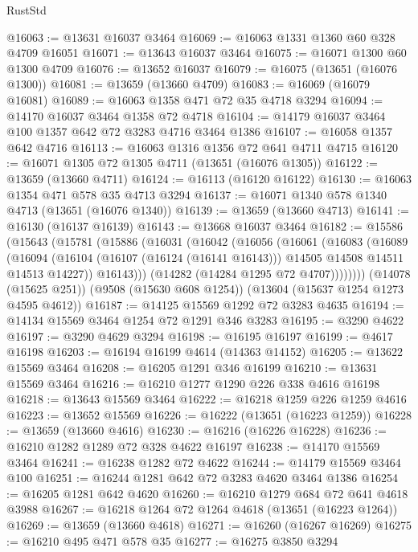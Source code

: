 \begin{lexlean}{RustStd}
\begin{coremodule}
@16063 := @13631 @16037 @3464
@16069 := @16063 @1331 @1360 @60 @328 @4709 @16051
@16071 := @13643 @16037 @3464
@16075 := @16071 @1300 @60 @1300 @4709
@16076 := @13652 @16037
@16079 := @16075 (@13651 (@16076 @1300))
@16081 := @13659 (@13660 @4709)
@16083 := @16069 (@16079 @16081)
@16089 := @16063 @1358 @471 @72 @35 @4718 @3294
@16094 := @14170 @16037 @3464 @1358 @72 @4718
@16104 := @14179 @16037 @3464 @100 @1357 @642 @72 @3283 @4716 @3464 @1386
@16107 := @16058 @1357 @642 @4716
@16113 := @16063 @1316 @1356 @72 @641 @4711 @4715
@16120 := @16071 @1305 @72 @1305 @4711 (@13651 (@16076 @1305))
@16122 := @13659 (@13660 @4711)
@16124 := @16113 (@16120 @16122)
@16130 := @16063 @1354 @471 @578 @35 @4713 @3294
@16137 := @16071 @1340 @578 @1340 @4713 (@13651 (@16076 @1340))
@16139 := @13659 (@13660 @4713)
@16141 := @16130 (@16137 @16139)
@16143 := @13668 @16037 @3464
@16182 := @15586
    (@15643
      (@15781
        (@15886
          (@16031
            (@16042
              (@16056
                (@16061
                  (@16083
                    (@16089
                      (@16094
                        (@16104
                          (@16107 (@16124 (@16141 @16143)))
                          @14505
                          @14508
                          @14511
                          @14513
                          @14227))
                      @16143)))
                (@14282 (@14284 @1295 @72 @4707))))))))
    (@14078 (@15625 @251))
    (@9508 (@15630 @608 @1254))
    (@13604 (@15637 @1254 @1273 @4595 @4612))
@16187 := @14125 @15569 @1292 @72 @3283 @4635
@16194 := @14134 @15569 @3464 @1254 @72 @1291 @346 @3283
@16195 := @3290 @4622
@16197 := @3290 @4629 @3294
@16198 := @16195 @16197
@16199 := @4617 @16198
@16203 := @16194 @16199 @4614 (@14363 @14152)
@16205 := @13622 @15569 @3464
@16208 := @16205 @1291 @346 @16199
@16210 := @13631 @15569 @3464
@16216 := @16210 @1277 @1290 @226 @338 @4616 @16198
@16218 := @13643 @15569 @3464
@16222 := @16218 @1259 @226 @1259 @4616
@16223 := @13652 @15569
@16226 := @16222 (@13651 (@16223 @1259))
@16228 := @13659 (@13660 @4616)
@16230 := @16216 (@16226 @16228)
@16236 := @16210 @1282 @1289 @72 @328 @4622 @16197
@16238 := @14170 @15569 @3464
@16241 := @16238 @1282 @72 @4622
@16244 := @14179 @15569 @3464 @100
@16251 := @16244 @1281 @642 @72 @3283 @4620 @3464 @1386
@16254 := @16205 @1281 @642 @4620
@16260 := @16210 @1279 @684 @72 @641 @4618 @3988
@16267 := @16218 @1264 @72 @1264 @4618 (@13651 (@16223 @1264))
@16269 := @13659 (@13660 @4618)
@16271 := @16260 (@16267 @16269)
@16275 := @16210 @495 @471 @578 @35
@16277 := @16275 @3850 @3294

\end{coremodule}
\end{lexlean}
